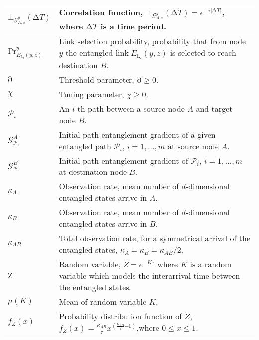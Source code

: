 \documentclass[11pt]{article}%
\begin{document}
\begin{longtable}{|p{1.6in}|p{2.8in}|}
${\mathrm{\bot }}_{{\mathcal{G}}^y_{A,x}}\left(\mathrm{\Delta }T\right)$ & Correlation function, ${\mathrm{\bot }}_{{\mathcal{G}}^y_{A,x}}\left(\mathrm{\Delta }T\right)\mathrm{=}e^{\mathrm{-}\tau \left|\mathrm{\Delta }T\right|}$, where $\mathrm{\Delta }T$ is a time period. \\ \hline 
$\mathrm{P}{\mathrm{r}}^y_{E_{{\mathrm{L}}_l}\left(y,z\right)}$ & Link selection probability, probability that from node $y$ the entangled link $E_{{\mathrm{L}}_l}\left(y,z\right)$ is selected to reach destination $B$.  \\ \hline 
$\mathrm{\partial }$ & Threshold parameter, $\mathrm{\partial }\mathrm{\ge }\mathrm{0}$. \\ \hline 
$\chi $\textit{} & Tuning parameter, $\chi \mathrm{\ge }\mathrm{0}$. \\ \hline 
${\mathcal{P}}_i$ & An $i$-th path between a source node $A$ and target node $B$. \\ \hline 
${\mathcal{G}}^A_{{\mathcal{P}}_i}$ & Initial path entanglement gradient of a given entangled path ${\mathcal{P}}_i$, $i\mathrm{=1,\dots ,}m$ at source node $A$. \\ \hline 
${\mathcal{G}}^B_{{\mathcal{P}}_i}$ & Initial path entanglement gradient of ${\mathcal{P}}_i$, $i\mathrm{=1,\dots ,}m$ at destination node $B$. \\ \hline 
${\kappa }_A$\textit{} & Observation rate, mean number of $d$-dimensional entangled states arrive in $A$. \\ \hline 
${\kappa }_B$\textit{} & Observation rate, mean number of $d$-dimensional entangled states arrive in $B$. \\ \hline 
${\kappa }_{AB}$ & Total observation rate, for a symmetrical arrival of the entangled states, ${\kappa }_A\mathrm{=}{\kappa }_B\mathrm{=}{{\kappa }_{AB}}/{\mathrm{2}}$. \\ \hline 
$\mathrm{Z}$ & Random variable, $Z\mathrm{=}e^{\mathrm{-}K\tau }$ where $K$ is a random variable which models the interarrival time between the entangled states. \\ \hline 
$\mu \left(K\right)$ & Mean of random variable $K$. \\ \hline 
$f_Z\left(x\right)$ & Probability distribution function of $Z$, \newline $f_Z\left(x\right)\mathrm{=}\frac{{\kappa }_{AB}}{\tau }x^{\left(\frac{{\kappa }_{AB}}{\tau }\mathrm{-}\mathrm{1}\right)}$,\newline where $\mathrm{0}\mathrm{\le }x\mathrm{\le }\mathrm{1}$.     \\ \hline 

\end{longtable}
\end{document}
